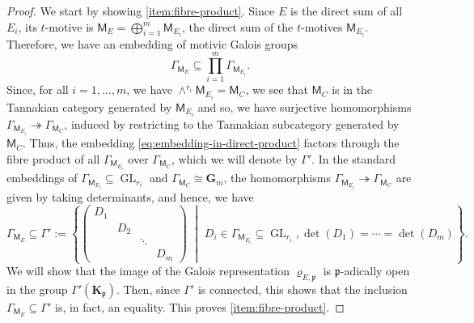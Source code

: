 \documentclass[10pt,a4paper]{amsart}
\theoremstyle{plain} %
\theoremstyle{definition}
\theoremstyle{remark}
\newcommand{\fp}{\mathfrak{p}}  %
\newcommand{\bK}{\mathbf{K}}
\newcommand{\GL}{\operatorname{GL}}
\newcommand{\Gm}{\textbf{G}_{m}}
\newcommand{\mot}{\mathsf{M}}  %
\numberwithin{equation}{subsection}
\begin{document}
\begin{proof}
We start by showing \eqref{item:fibre-product}.
Since $E$ is the direct sum of all $E_i$, its $t$-motive is $\mot_E = \bigoplus_{i=1}^m\mot_{E_i}$, the direct sum of the $t$-motives $\mot_{E_i}$. 
Therefore, we have an embedding of motivic Galois groups
\begin{equation}\label{eq:embedding-in-direct-product}
\Gamma_{\mot_E}\subseteq \prod_{i=1}^m \Gamma_{\mot_{E_i}}.\end{equation}
Since, for all $i=1, \dots, m$, we have 
$\wedge^{r_i} \mot_{E_i} = \mot_C$, we see that $\mot_C$ is in the Tannakian category generated by $\mot_{E_i}$ and so, we have surjective homomorphisms $\Gamma_{\mot_{E_i}} \twoheadrightarrow\Gamma_{\mot_C}$, induced by restricting to the Tannakian subcategory generated by $\mot_C$.
Thus, the embedding \eqref{eq:embedding-in-direct-product} factors through the fibre product of all $\Gamma_{\mot_{E_i}}$ over $\Gamma_{\mot_{C}}$, which we will denote by $\Gamma'$.
In the standard embeddings of $\Gamma_{\mot_{E_i}}\subseteq \GL_{r_i}$ and $\Gamma_{\mot_C}\cong \Gm$, the homomorphisms $\Gamma_{\mot_{E_i}} \twoheadrightarrow \Gamma_{\mot_C}$ are given by taking determinants, and hence, we have
\[ \Gamma_{\mot_E} \subseteq \Gamma':= \left\{ \begin{pmatrix}
    D_1 & & & \\ & D_2 & & \\ & & \ddots & \\ & & & D_m
\end{pmatrix} \,\,\middle|\,\, D_i\in \Gamma_{\mot_{E_i}}\subseteq \GL_{r_i}, \det(D_1)=\cdots = \det(D_m)  \right\}.  \]
We will show that the image of the Galois representation $\varrho_{E,\fp}$ is $\fp$-adically open in the group $\Gamma'(\bK_\fp)$. Then, since $\Gamma'$ is connected, this shows that the inclusion $\Gamma_{\mot_E} \subseteq \Gamma'$ is, in fact, an equality. 
This proves \eqref{item:fibre-product}.

\medskip


\end{proof}
\end{document}
